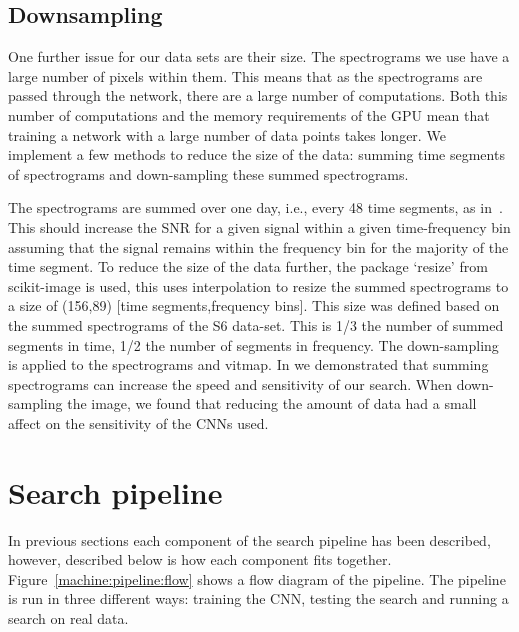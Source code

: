\subsection{\label{machine:data:downsample} Downsampling}

%
One further issue for our data sets are their size. The spectrograms we use have a large number of pixels within them.
This means that as the spectrograms are passed through the network, there are a large number of computations.
Both this number of computations and the memory requirements of the GPU mean that training a network with a large number of data points takes longer.
We implement a few methods to reduce the size of the data: summing time segments of
spectrograms and down-sampling these summed spectrograms.  

%
The spectrograms are summed over one day, i.e., every 48 time segments, as
in~\cite{bayley2019SOAPGeneralised}. This should increase the \gls{SNR} for a
given signal within a given time-frequency bin assuming that the
signal remains within the frequency bin for the majority of the time segment.
To reduce the size of the data further, the package `resize' from scikit-image
\cite{vanderwalt2014ScikitimageImage} is used, this uses interpolation to
resize the summed spectrograms to a size of (156,89) [time segments,frequency
bins]. This size was defined based on the summed spectrograms of the S6 data-set. This is 1/3 the number of summed segments in time, 1/2 the number of segments in frequency. The down-sampling is applied to the
spectrograms and vitmap. 
In \cite{bayley2019SOAPGeneralised} we demonstrated that summing spectrograms can increase the speed and sensitivity of our search.
When down-sampling the image, we found that reducing the amount of data had a small affect on the sensitivity of the \glspl{CNN} used.

\section{\label{machine:pipeline}Search pipeline}

%
In previous sections each component of the search pipeline has been described,
however, described below is how each component fits together.
Figure~\ref{machine:pipeline:flow} shows a flow diagram of the pipeline. The pipeline is
run in three different ways: training the \gls{CNN}, testing the search and
running a search on real data. 

